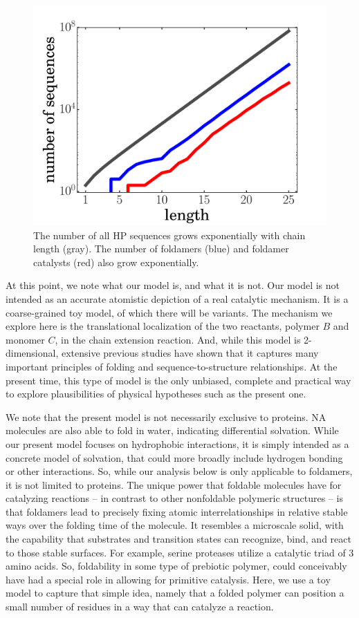 \documentclass[5p,times]{elsarticle}
\begin{document}
\begin{figure}[hbt!]
  \centering
  \includegraphics[width=0.9\columnwidth]{pictures/hp-statistics.pdf} 
  \caption{\footnotesize{The number of all HP sequences grows exponentially with chain 
length (gray).  The number of foldamers (blue) and foldamer catalysts (red) also grow 
exponentially.}}
  \label{fig:hp-statistics}
\end{figure}

At this point, we note what our model is, and what it is not.  Our model is not intended as an 
 accurate atomistic depiction of a real catalytic mechanism.  It is a coarse-grained toy model, of 
which there will be variants.  The mechanism we explore here is the translational localization of 
the two reactants, polymer $B$ and monomer $C$, in the chain extension reaction.  And, while this 
model is 2-dimensional, extensive previous studies have shown that it captures many important 
principles of folding and sequence-to-structure relationships.  At the present time, this type of 
model is the only unbiased, complete and practical way to explore plausibilities of physical 
hypotheses such as the present one.

We note that the present model is not necessarily exclusive to proteins.  NA molecules are also able 
to fold in water, indicating differential solvation.  While our present model focuses on hydrophobic 
interactions, it is simply intended as a concrete model of solvation, that could more broadly 
include hydrogen bonding or other interactions.  So, while our 
analysis below is only applicable to foldamers, it is not limited to proteins.  The unique power 
that foldable molecules have for catalyzing reactions -- in contrast to other nonfoldable polymeric 
structures -- is that foldamers lead to precisely fixing atomic interrelationships in relative 
stable ways over the folding time of the molecule.  It resembles a 
microscale solid, with the capability that substrates and transition states can recognize, bind, and 
react to those stable surfaces. For example, serine proteases utilize a catalytic triad of 3 amino 
acids.  So, foldability in some type of prebiotic polymer, could conceivably have had a special role 
in allowing for primitive catalysis.  Here, we use a toy model to capture that simple idea, namely 
that a folded polymer can position a small number of residues in a way that can catalyze a reaction.
\end{document}
